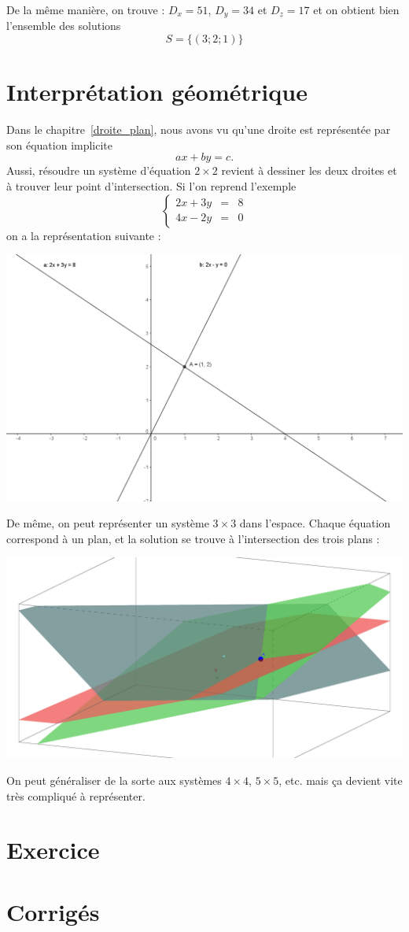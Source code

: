De la même manière, on trouve : $D_x = 51$, $D_y = 34$ et $D_z = 17$ et on obtient bien l'ensemble des solutions
$$
S = \{(3;2;1)\}
$$

\section{Interprétation géométrique}

Dans le chapitre~\ref{droite_plan}, nous avons vu qu'une droite est représentée par son équation implicite
$$
ax+by=c.
$$
Aussi, résoudre un système d'équation $2\times 2$ revient à dessiner les deux droites et à trouver leur point d'intersection. Si l'on reprend l'exemple 
$$
\left\{
\begin{array}{lll}
2x+3y &=& 8\\
4x-2y &=& 0
\end{array}
\right.
$$
on a la représentation suivante :

\begin{center}
\includegraphics[width = 0.9 \textwidth]{systeme/systeme2x2.png}
\end{center}

De même, on peut représenter un système $3\times 3$ dans l'espace. Chaque équation correspond à un plan, et la solution se trouve à l'intersection des trois plans :

\begin{center}
\includegraphics[width = 0.9 \textwidth]{systeme/systeme3x3.png}
\end{center}

On peut généraliser de la sorte aux systèmes $4\times 4$, $5\times 5$, etc. mais ça devient vite très compliqué à représenter.
\section{Exercice}



\section{Corrigés}


